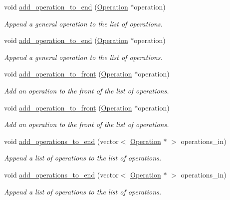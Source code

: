 \begin{DoxyCompactItemize}
void \hyperlink{class_operation__block_a0048efcfca374a6b960a1092ab564f03}{add\+\_\+operation\+\_\+to\+\_\+end} (\hyperlink{class_operation}{Operation} $\ast$operation)
\begin{DoxyCompactList}\small\item\em Append a general operation to the list of operations. \end{DoxyCompactList}\item 
void \hyperlink{class_operation__block_a0048efcfca374a6b960a1092ab564f03}{add\+\_\+operation\+\_\+to\+\_\+end} (\hyperlink{class_operation}{Operation} $\ast$operation)
\begin{DoxyCompactList}\small\item\em Append a general operation to the list of operations. \end{DoxyCompactList}\item 
void \hyperlink{class_operation__block_a1db22aed1f33a97bcaa2fad8c321a243}{add\+\_\+operation\+\_\+to\+\_\+front} (\hyperlink{class_operation}{Operation} $\ast$operation)
\begin{DoxyCompactList}\small\item\em Add an operation to the front of the list of operations. \end{DoxyCompactList}\item 
void \hyperlink{class_operation__block_a1db22aed1f33a97bcaa2fad8c321a243}{add\+\_\+operation\+\_\+to\+\_\+front} (\hyperlink{class_operation}{Operation} $\ast$operation)
\begin{DoxyCompactList}\small\item\em Add an operation to the front of the list of operations. \end{DoxyCompactList}\item 
void \hyperlink{class_operation__block_a2253d0a652bdce52a53d45e6d0a41abd}{add\+\_\+operations\+\_\+to\+\_\+end} (vector$<$ \hyperlink{class_operation}{Operation} $\ast$ $>$ operations\+\_\+in)
\begin{DoxyCompactList}\small\item\em Append a list of operations to the list of operations. \end{DoxyCompactList}\item 
void \hyperlink{class_operation__block_a2253d0a652bdce52a53d45e6d0a41abd}{add\+\_\+operations\+\_\+to\+\_\+end} (vector$<$ \hyperlink{class_operation}{Operation} $\ast$ $>$ operations\+\_\+in)
\begin{DoxyCompactList}\small\item\em Append a list of operations to the list of operations. \end{DoxyCompactList}\item 

\end{DoxyCompactItemize}
